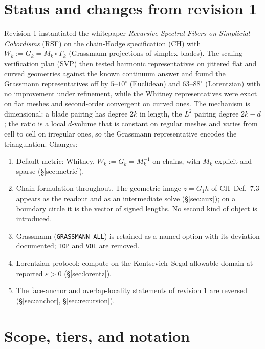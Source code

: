 \documentclass[11pt]{article}
\theoremstyle{definition}
\theoremstyle{plain}
\theoremstyle{remark}
\newcommand{\ttt}[1]{\texttt{#1}}
\begin{document}
\tableofcontents

\section{Status and changes from revision 1}\label{sec:status}

Revision 1 instantiated the whitepaper \emph{Recursive Spectral Fibers on Simplicial Cobordisms} (RSF) on the chain-Hodge specification (CH) with \(W_k:=G_k=M_k\circ\Gamma_k\) (Grassmann projections of simplex blades). The scaling verification plan (SVP) then tested harmonic representatives on jittered flat and curved geometries against the known continuum answer and found the Grassmann representatives off by \(5\)--\(10^{\circ}\) (Euclidean) and \(63\)--\(88^{\circ}\) (Lorentzian) with no improvement under refinement, while the Whitney representatives were exact on flat meshes and second-order convergent on curved ones. The mechanism is dimensional: a blade pairing has degree \(2k\) in length, the \(L^{2}\) pairing degree \(2k-d\); the ratio is a local \(d\)-volume that is constant on regular meshes and varies from cell to cell on irregular ones, so the Grassmann representative encodes the triangulation. Changes:
\begin{enumerate}[nosep]
\item Default metric: Whitney, \(W_k:=G_k=M_k^{-1}\) on chains, with \(M_k\) explicit and sparse (\S\ref{sec:metric}).
\item Chain formulation throughout. The geometric image \(z=G_1h\) of CH~Def.~7.3 appears as the readout and as an intermediate solve (\S\ref{sec:aux}); on a boundary circle it is the vector of signed lengths. No second kind of object is introduced.
\item Grassmann (\ttt{GRASSMANN\_ALL}) is retained as a named option with its deviation documented; \ttt{TOP} and \ttt{VOL} are removed.
\item Lorentzian protocol: compute on the Kontsevich--Segal allowable domain at reported \(\varepsilon>0\) (\S\ref{sec:lorentz}).
\item The face-anchor and overlap-locality statements of revision 1 are reversed (\S\ref{sec:anchor}, \S\ref{sec:recursion}).
\end{enumerate}

\section{Scope, tiers, and notation}\label{sec:notation}
\end{document}
